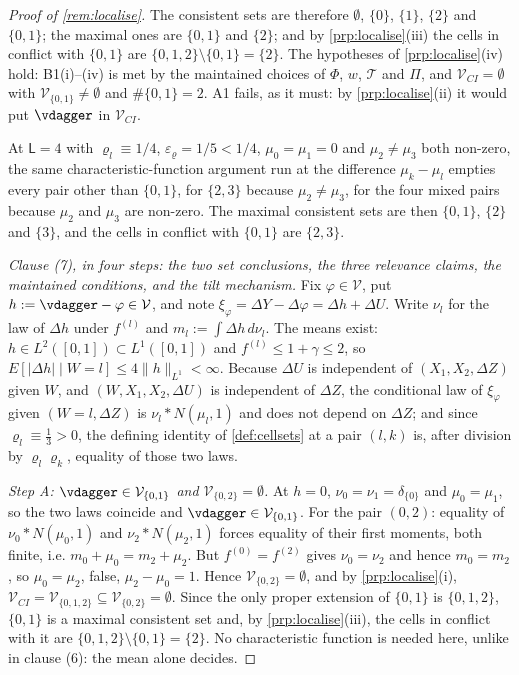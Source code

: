 \begin{proof}[Proof of \cref{rem:localise}]
The consistent sets are therefore $\emptyset$, $\{0\}$, $\{1\}$, $\{2\}$ and $\{0,1\}$; the maximal
ones are $\{0,1\}$ and $\{2\}$; and by \cref{prp:localise}\textup{(iii)} the cells in conflict with
$\{0,1\}$ are $\{0,1,2\}\setminus\{0,1\}=\{2\}$. The hypotheses of
\cref{prp:localise}\textup{(iv)} hold: B1(i)--(iv) is met by the maintained choices of $\Phi$, $w$,
$\mathcal T$ and $\Pi$, and $\mathcal V_{CI}=\emptyset$ with
$\mathcal V_{\{0,1\}}\neq\emptyset$ and $\#\{0,1\}=2$. A1 fails, as it must: by
\cref{prp:localise}\textup{(ii)} it would put $\vdagger$ in $\mathcal V_{CI}$.

At $\mathsf L=4$ with $\varrho_l\equiv1/4$, $\varepsilon_\varrho=1/5<1/4$, $\mu_0=\mu_1=0$ and
$\mu_2\neq\mu_3$ both non-zero, the same characteristic-function argument run at the difference
$\mu_k-\mu_l$ empties every pair other than $\{0,1\}$, for $\{2,3\}$ because $\mu_2\neq\mu_3$, for
the four mixed pairs because $\mu_2$ and $\mu_3$ are non-zero. The maximal consistent sets are then
$\{0,1\}$, $\{2\}$ and $\{3\}$, and the cells in conflict with $\{0,1\}$ are $\{2,3\}$.

\emph{Clause \textup{(7)}, in four steps: the two set conclusions, the three relevance claims, the
maintained conditions, and the tilt mechanism.} Fix $\varphi\in\mathcal V$, put
$h:=\vdagger-\varphi\in\mathcal V$, and note $\xi_\varphi=\Delta Y-\Delta\varphi=\Delta h+\Delta U$.
Write $\nu_l$ for the law of $\Delta h$ under $f^{(l)}$ and $m_l:=\int\Delta h\,d\nu_l$. The means
exist: $h\in L^{2}([0,1])\subset L^{1}([0,1])$ and $f^{(l)}\le1+\gamma\le2$, so
$E[|\Delta h|\mid W=l]\le4\|h\|_{L^{1}}<\infty$. Because $\Delta U$ is independent of
$(X_1,X_2,\Delta Z)$ given $W$, and $(W,X_1,X_2,\Delta U)$ is independent of $\Delta Z$, the
conditional law of $\xi_\varphi$ given $(W=l,\Delta Z)$ is $\nu_l\ast N(\mu_l,1)$ and does not depend
on $\Delta Z$; and since $\varrho_l\equiv\tfrac13>0$, the defining identity of \cref{def:cellsets} at a
pair $(l,k)$ is, after division by $\varrho_l\varrho_k$, equality of those two laws.

\emph{Step A: $\vdagger\in\mathcal V_{\{0,1\}}$ and $\mathcal V_{\{0,2\}}=\emptyset$.} At $h=0$,
$\nu_0=\nu_1=\delta_{\{0\}}$ and $\mu_0=\mu_1$, so the two laws coincide and
$\vdagger\in\mathcal V_{\{0,1\}}$. For the pair $(0,2)$: equality of $\nu_0\ast N(\mu_0,1)$ and
$\nu_2\ast N(\mu_2,1)$ forces equality of their first moments, both finite, i.e.
$m_0+\mu_0=m_2+\mu_2$. But $f^{(0)}=f^{(2)}$ gives $\nu_0=\nu_2$ and hence $m_0=m_2$, so
$\mu_0=\mu_2$, false, $\mu_2-\mu_0=1$. Hence $\mathcal V_{\{0,2\}}=\emptyset$, and by
\cref{prp:localise}\textup{(i)}, $\mathcal V_{CI}=\mathcal V_{\{0,1,2\}}\subseteq\mathcal V_{\{0,2\}}=\emptyset$.
Since the only proper extension of $\{0,1\}$ is $\{0,1,2\}$, $\{0,1\}$ is a maximal consistent set and,
by \cref{prp:localise}\textup{(iii)}, the cells in conflict with it are $\{0,1,2\}\setminus\{0,1\}=\{2\}$.
No characteristic function is needed here, unlike in clause \textup{(6)}: the mean alone decides.


\end{proof}
